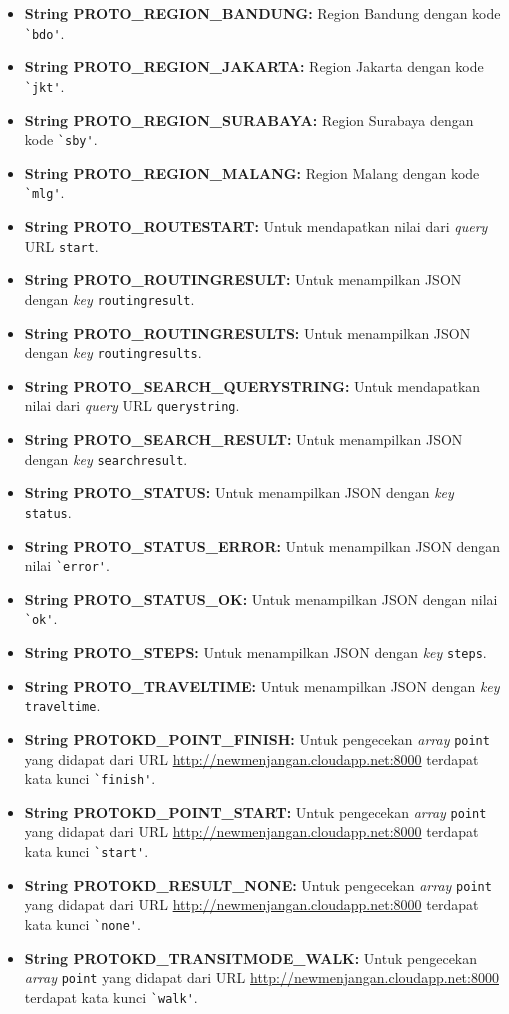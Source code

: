 \begin{enumerate}
\begin{itemize}
		\item \textbf{String PROTO\_REGION\_BANDUNG:} Region Bandung dengan kode \verb!`bdo'!.
		\item \textbf{String PROTO\_REGION\_JAKARTA:} Region Jakarta dengan kode \verb!`jkt'!.
		\item \textbf{String PROTO\_REGION\_SURABAYA:} Region Surabaya dengan kode \verb!`sby'!.
		\item \textbf{String PROTO\_REGION\_MALANG:} Region Malang dengan kode \verb!`mlg'!.
		\item \textbf{String PROTO\_ROUTESTART:} Untuk mendapatkan nilai dari \textit{query} URL \verb!start!.
		\item \textbf{String PROTO\_ROUTINGRESULT:} Untuk menampilkan JSON dengan \textit{key} \verb!routingresult!.
		\item \textbf{String PROTO\_ROUTINGRESULTS:} Untuk menampilkan JSON dengan \textit{key} \verb!routingresults!.
		\item \textbf{String PROTO\_SEARCH\_QUERYSTRING:} Untuk mendapatkan nilai dari \textit{query} URL \verb!querystring!.
		\item \textbf{String PROTO\_SEARCH\_RESULT:} Untuk menampilkan JSON dengan \textit{key} \verb!searchresult!.
		\item \textbf{String PROTO\_STATUS:} Untuk menampilkan JSON dengan \textit{key} \verb!status!.
		\item \textbf{String PROTO\_STATUS\_ERROR:} Untuk menampilkan JSON dengan nilai \verb!`error'!.
		\item \textbf{String PROTO\_STATUS\_OK:} Untuk menampilkan JSON dengan nilai \verb!`ok'!.
		\item \textbf{String PROTO\_STEPS:} Untuk menampilkan JSON dengan \textit{key} \verb!steps!.
		\item \textbf{String PROTO\_TRAVELTIME:} Untuk menampilkan JSON dengan \textit{key} \verb!traveltime!.
		\item \textbf{String PROTOKD\_POINT\_FINISH:} Untuk pengecekan \textit{array} \verb!point! yang didapat dari URL \url{http://newmenjangan.cloudapp.net:8000} terdapat kata kunci \verb!`finish'!.
		\item \textbf{String PROTOKD\_POINT\_START:} Untuk pengecekan \textit{array} \verb!point! yang didapat dari URL \url{http://newmenjangan.cloudapp.net:8000} terdapat kata kunci \verb!`start'!.
		\item \textbf{String PROTOKD\_RESULT\_NONE:} Untuk pengecekan \textit{array} \verb!point! yang didapat dari URL \url{http://newmenjangan.cloudapp.net:8000} terdapat kata kunci \verb!`none'!.
		\item \textbf{String PROTOKD\_TRANSITMODE\_WALK:} Untuk pengecekan \textit{array} \verb!point! yang didapat dari URL \url{http://newmenjangan.cloudapp.net:8000} terdapat kata kunci \verb!`walk'!.
	\end{itemize}
	

\end{enumerate}
